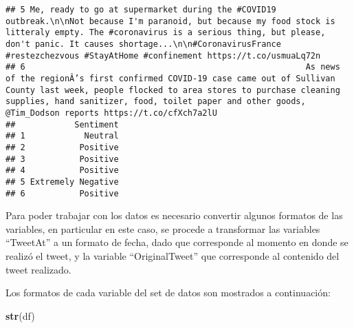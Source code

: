 \documentclass[
]{article}
\newenvironment{Shaded}{\begin{snugshade}}{\end{snugshade}}
\newcommand{\DataTypeTok}[1]{\textcolor[rgb]{0.13,0.29,0.53}{#1}}
\newcommand{\KeywordTok}[1]{\textcolor[rgb]{0.13,0.29,0.53}{\textbf{#1}}}
\newcommand{\NormalTok}[1]{#1}
\newcommand{\OperatorTok}[1]{\textcolor[rgb]{0.81,0.36,0.00}{\textbf{#1}}}
\newcommand{\StringTok}[1]{\textcolor[rgb]{0.31,0.60,0.02}{#1}}
\begin{document}
\begin{verbatim}
## 5 Me, ready to go at supermarket during the #COVID19 outbreak.\n\nNot because I'm paranoid, but because my food stock is litteraly empty. The #coronavirus is a serious thing, but please, don't panic. It causes shortage...\n\n#CoronavirusFrance #restezchezvous #StayAtHome #confinement https://t.co/usmuaLq72n
## 6                                                         As news of the regionÂ’s first confirmed COVID-19 case came out of Sullivan County last week, people flocked to area stores to purchase cleaning supplies, hand sanitizer, food, toilet paper and other goods, @Tim_Dodson reports https://t.co/cfXch7a2lU
##            Sentiment
## 1            Neutral
## 2           Positive
## 3           Positive
## 4           Positive
## 5 Extremely Negative
## 6           Positive
\end{verbatim}

Para poder trabajar con los datos es necesario convertir algunos
formatos de las variables, en particular en este caso, se procede a
transformar las variables ``TweetAt'' a un formato de fecha, dado que
corresponde al momento en donde se realizó el tweet, y la variable
``OriginalTweet'' que corresponde al contenido del tweet realizado.

\begin{Shaded}
\end{Shaded}

Los formatos de cada variable del set de datos son mostrados a
continuación:

\begin{Shaded}
\begin{Highlighting}[]
\KeywordTok{str}\NormalTok{(df)}
\end{Highlighting}
\end{Shaded}
\end{document}
